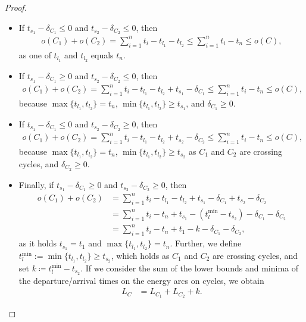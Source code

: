 \documentclass[11pt,a4paper]{article}
\theoremstyle{definition}
\theoremstyle{remark}
\begin{document}
\begin{proof}
	\begin{itemize}
		\item If $t_{s_1} - \delta_{C_1} \leq 0$ and $t_{s_2} - \delta_{C_2} \leq 0$, then 
		\begin{align*}
			o(C_1) + o(C_2) = \sum_{i=1}^n t_i - t_{l_1} - t_{l_2} \leq \sum_{i=1}^n t_i - t_n \leq o(C),
		\end{align*}
		as one of $t_{l_1}$ and $t_{l_2}$ equals $t_n$.
		\item If $t_{s_1} - \delta_{C_1} \geq 0$ and $t_{s_2} - \delta_{C_2} \leq 0$, then 
		\begin{align*}
			o(C_1) + o(C_2) = \sum_{i=1}^n t_i - t_{l_1} - t_{l_2} + t_{s_1} - \delta_{C_1} \leq \sum_{i=1}^n t_i - t_n \leq o(C),
		\end{align*}
		because $\max\{t_{l_1}, t_{l_2}\} = t_n$, $\min\{t_{l_1}, t_{l_2}\} \geq t_{s_1}$, and $\delta_{C_1} \geq 0$.
		\item If $t_{s_1} - \delta_{C_1} \leq 0$ and $t_{s_2} - \delta_{C_2} \geq 0$, then 
		\begin{align*}
			o(C_1) + o(C_2) = \sum_{i=1}^n t_i - t_{l_1} - t_{l_2} + t_{s_2} - \delta_{C_2} \leq \sum_{i=1}^n t_i - t_n \leq o(C),
		\end{align*}
		because $\max\{t_{l_1}, t_{l_2}\} = t_n$, $\min\{t_{l_1}, t_{l_2}\} \geq t_{s_2}$ as $C_1$ and $C_2$ are crossing cycles, and $\delta_{C_2} \geq 0$.
		\item Finally, if $t_{s_1} - \delta_{C_1} \geq 0$ and $t_{s_2} - \delta_{C_2} \geq 0$, then
		\begin{align*}
			o(C_1) + o(C_2) &= \sum_{i=1}^n t_i - t_{l_1} - t_{l_2} + t_{s_1} - \delta_{C_1} + t_{s_2} - \delta_{C_2}\\ & = \sum_{i=1}^n t_i - t_{n} + t_{s_1} - (t^{\min}_{l} - t_{s_2}) - \delta_{C_1} - \delta_{C_2}  \\
            &= \sum_{i=1}^n t_i - t_{n} + t_1 - k  - \delta_{C_1} - \delta_{C_2},
		\end{align*}
		as it holds $t_{s_1} = t_1$ and $\max\{t_{l_1}, t_{l_2}\} = t_n$. Further, we define $t^{\min}_{l}:= \min\{t_{l_1}, t_{l_2}\} \geq t_{s_2}$, which holds as $C_1$ and $C_2$ are crossing cycles, and set $k \coloneqq t^{\min}_{l}- t_{s_2}$.
        If we consider the sum of the lower bounds and minima of the departure/arrival times on the energy arcs on cycles, we obtain
        \begin{align*}
            L_C &= L_{C_1} + L_{C_2} + k.
        \end{align*}


\end{itemize}
\end{proof}
\end{document}
